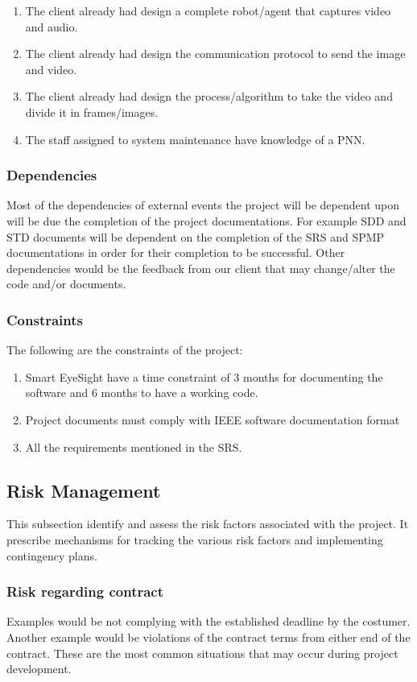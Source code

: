 \documentclass[12pt]{article}
\begin{document}
\begin{enumerate}
  \item The client already had design a complete robot/agent that captures video and audio.
  \item The client already had design the communication protocol to send the image and video.
  \item The client already had design the process/algorithm to take the video and divide it in frames/images.
  \item The staff assigned to system maintenance have knowledge of a PNN.
\end{enumerate}
\subsubsection{Dependencies}
Most of the dependencies of external events the project will be dependent upon will be due the completion of the project documentations. For example SDD and STD documents will be dependent on the completion of the SRS and SPMP documentations in order for their completion to be successful. Other dependencies would be the feedback from our client that may change/alter the code and/or documents.
\subsubsection{Constraints}
The following are the constraints of the project:
\begin{enumerate}
  \item Smart EyeSight have a time constraint of 3 months for documenting the software and 6 months to have a working code.
  \item Project documents must comply with IEEE software documentation format
  \item All the requirements mentioned in the SRS.
\end{enumerate}

\subsection{Risk Management}
This subsection identify and assess the risk factors associated with the project. It prescribe mechanisms for tracking the various risk factors and implementing contingency plans.

\subsubsection{Risk regarding contract}
  Examples would be not complying with the established deadline by the costumer. Another example would be violations of the contract terms from either end of the contract. These are the most common situations that may occur during project development.
\end{document}
